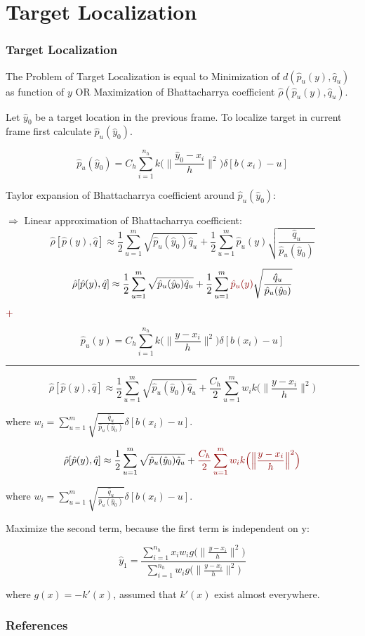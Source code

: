 \documentclass[hyperref={pdfpagelabels=false}]{beamer}
\begin{document}
\section{Target Localization}
\begin{frame}[allowframebreaks]
\frametitle{Target Localization}
The Problem of Target Localization is equal to {\color{darkred} Minimization of $d(\hat{p}_u(y),\hat{q}_u)$} as function of $y$ OR {\color{darkred} Maximization of Bhattacharrya coefficient} $\hat{\rho}(\hat{p}_u(y),\hat{q}_u)$.

\vspace{10pt}
Let $\hat{y}_0$ be a target location in the previous frame. To localize target in current frame first calculate $\hat{p}_u(\hat{y}_0)$.

	 $$ \hat{p}_u(\hat{y}_0) = C_h \sum_{i=1}^{n_h}k\Big(\Big\lVert\frac{ \hat{y}_0-x_i}{h}\Big\rVert^2\Big)\delta[b(x_i)-u]$$

\newpage

Taylor expansion of Bhattacharrya coefficient around $\hat{p}_u(\hat{y}_0)$:


$\Rightarrow$ Linear approximation of Bhattacharrya coefficient: 
$$\hat{\rho}[\hat{p}(y), \hat{q}] \approx \frac{1}{2}\sum_{u=1}^{m}\sqrt{\hat{p}_u(\hat{y}_0) \hat{q}_u}+\frac{1}{2}\sum_{u=1}^{m}\hat{p}_u(y)\sqrt{\frac{\hat{q}_u}{\hat{p}_u(\hat{y}_0)}}$$

\newpage

$$\hat{\rho}[\hat{p}(y), \hat{q}] \approx \frac{1}{2}\sum_{u=1}^{m}\sqrt{\hat{p}_u(\hat{y}_0) \hat{q}_u}+\frac{1}{2}\sum_{u=1}^{m}{\color{darkred}\hat{p}_u(y)}\sqrt{\frac{\hat{q}_u}{\hat{p}_u(\hat{y}_0)}}$$

$\color{darkred} + $

$$ \hat{p}_u(y) = C_h \sum_{i=1}^{n_h}k\Big(\Big\lVert\frac{ y-x_i}{h}\Big\rVert^2\Big)\delta[b(x_i)-u]$$

\noindent\rule{11cm}{0.4pt}
$$\hat{\rho}[\hat{p}(y), \hat{q}] \approx \frac{1}{2}\sum_{u=1}^{m}\sqrt{\hat{p}_u(\hat{y}_0) \hat{q}_u}+\frac{C_h}{2}\sum_{u=1}^{m}w_i k\Big(\Big\lVert\frac{ y-x_i}{h}\Big\rVert^2\Big)$$

where $w_i = \sum_{u=1}^{m}\sqrt{\frac{\hat{q}_u}{\hat{p}_u(\hat{y}_0)}}\delta[b(x_i)-u]$.


\newpage

$$\hat{\rho}[\hat{p}(y), \hat{q}] \approx \frac{1}{2}\sum_{u=1}^{m}\sqrt{\hat{p}_u(\hat{y}_0) \hat{q}_u}+\color{darkred}\frac{C_h}{2}\sum_{u=1}^{m}w_i k\Big(\Big\lVert\frac{ y-x_i}{h}\Big\rVert^2\Big)$$

where $w_i = \sum_{u=1}^{m}\sqrt{\frac{\hat{q}_u}{\hat{p}_u(\hat{y}_0)}}\delta[b(x_i)-u]$.

Maximize the second term, because the first term is independent on y:

$$\hat{y}_1 = \frac{\sum_{i=1}^{n_h}x_iw_ig\Big(\Big\lVert\frac{ y-x_i}{h}\Big\rVert^2\Big)}{\sum_{i=1}^{n_h}w_ig\Big(\Big\lVert\frac{ y-x_i}{h}\Big\rVert^2\Big)}$$

where $g(x) = -k'(x)$, assumed that $k'(x)$ exist almost everywhere.

\end{frame}



\begin{frame}[allowframebreaks]
	\frametitle{References}
	\nocite{KernelBasedObjectTracking}
	
	
\end{frame}
\end{document}

